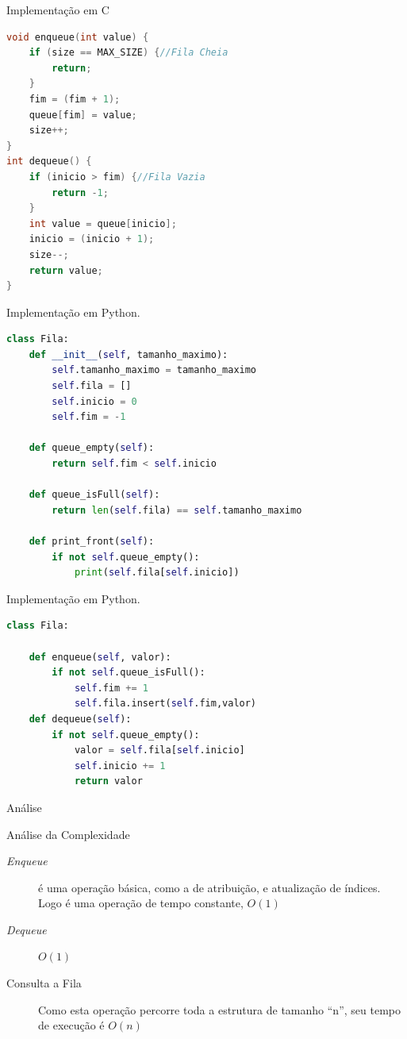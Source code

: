 \documentclass{beamer}
\begin{document}
\begin{frame}[fragile]{Implementação em C}

\centering\footnotesize
\begin{lstlisting}[language=C]
void enqueue(int value) {
    if (size == MAX_SIZE) {//Fila Cheia
        return;
    }
    fim = (fim + 1);
    queue[fim] = value;
    size++;
}
int dequeue() {
    if (inicio > fim) {//Fila Vazia
        return -1;
    }
    int value = queue[inicio];
    inicio = (inicio + 1);
    size--;
    return value;
}

\end{lstlisting}
\end{frame}


\begin{frame}[fragile]{Implementação em Python.}

\centering\footnotesize
\begin{lstlisting}[language=Python]
class Fila:
    def __init__(self, tamanho_maximo):
        self.tamanho_maximo = tamanho_maximo
        self.fila = []
        self.inicio = 0
        self.fim = -1

    def queue_empty(self):
        return self.fim < self.inicio

    def queue_isFull(self):
        return len(self.fila) == self.tamanho_maximo

    def print_front(self):
        if not self.queue_empty():
            print(self.fila[self.inicio])


\end{lstlisting}
\end{frame}


\begin{frame}[fragile]{Implementação em Python.}

\centering\footnotesize
\begin{lstlisting}[language=Python]
class Fila:

    def enqueue(self, valor):
        if not self.queue_isFull():
            self.fim += 1
            self.fila.insert(self.fim,valor)
    def dequeue(self):
        if not self.queue_empty():
            valor = self.fila[self.inicio]
            self.inicio += 1
            return valor


\end{lstlisting}
\end{frame}


\begin{frame}{Análise}
 \begin{block}{Análise da Complexidade}
 \begin{description}
  \item[\textit{Enqueue}] é uma operação básica, como a de atribuição, e atualização de índices. Logo é uma operação de tempo constante, $O(1)$ 
  \item[\textit{Dequeue}] $O(1)$
  \item [Consulta a Fila] Como esta operação percorre toda a estrutura de tamanho ``n'', seu tempo de execução é $O(n)$ 
 \end{description}

 \end{block}


\end{frame}
\end{document}

